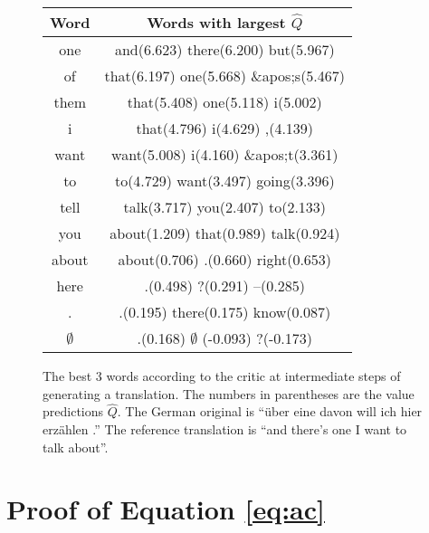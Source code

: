 \begin{figure}[h]%
\centering
\label{tab:qvalues}
\caption{The best 3 words according to the critic at intermediate
        steps of generating a translation. The numbers in parentheses
        are the value predictions $\hat{Q}$. The German original is 
        ``\"{u}ber eine davon will ich hier erz\"{a}hlen .''
        The reference translation is 
        ``and there's one I want to talk about''.}

\begin{tabular}{c|c}
    \textrm{Word} & \textrm{Words with largest $\hat{Q}$} \\
    \hline
    one &
    and(6.623) there(6.200) but(5.967) \\
    of &
    that(6.197) one(5.668) \&apos;s(5.467) \\
    them &
    that(5.408) one(5.118) i(5.002) \\
    i &
    that(4.796) i(4.629) ,(4.139) \\
    want &
    want(5.008) i(4.160) \&apos;t(3.361) \\
    to &
    to(4.729) want(3.497) going(3.396) \\
    tell &
    talk(3.717) you(2.407) to(2.133) \\
    you &
    about(1.209) that(0.989) talk(0.924) \\
    about &
    about(0.706) .(0.660) right(0.653) \\
    here &
    .(0.498) ?(0.291) --(0.285) \\
    . &
    .(0.195) there(0.175) know(0.087) \\
     $\emptyset$  &
    .(0.168)  $\emptyset$ (-0.093) ?(-0.173) \\
\end{tabular}
\end{figure}

\newpage

\section{Proof of Equation \eqref{eq:ac}}

